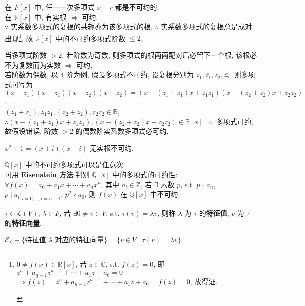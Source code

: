 \documentclass{note}
\begin{document}
在 $F[x]$ 中, 任一一次多项式 $x-r$ 都是不可约的.\\
在 $\mathbb{R}[x]$ 中, 有实根 $\Longleftrightarrow$ 可约.\\
$\because$ 实系数多项式的复根的共轭亦为该多项式的根, $\therefore$ 实系数多项式的复根总是成对出现\footnote{\begin{pf}
    $0\neq f(x)\in\mathbb{R}[x]$, 若 $z\in\mathbb{C}$, s.t. $f(z)=0$, 即 $z^n+a_{n-1}z^{n-1}+\cdots+a_1z+a_0=0$\\
    $\Longrightarrow\overline{f(z)}=\bar{z}^n+a_{n-1}\bar{z}^{n-1}+\cdots+a_1\bar{z}+a_0=f(\bar{z})=0$, 故得证.
\end{pf}}, 故 $\mathbb{R}[x]$ 中的不可约多项式阶数 $\leq 2$.
\begin{pf}
    当多项式阶数 $>2$, 若阶数为奇数, 则多项式的根两两配对后必留下一个根, 该根必不为复数而为实数 $\Longrightarrow$ 可约;\\
    若阶数为偶数, 以 $4$ 阶为例, 假设多项式不可约, 设复根分别为 $z_1,\bar{z_1},z_2,\bar{z_2}$, 则多项式可写为 $(x-z_1)(x-\bar{z}_1)(x-z_2)(x-\bar{z}_2)=(x-(z_1+\bar{z}_1)x+z_1\bar{z}_1)(x-(z_2+\bar{z}_2)x+z_2\bar{z}_2)$.\\
    $(z_1+\bar{z}_1),z_1\bar{z_1},(z_2+\bar{z}_2),z_2\bar{z_2}\in\mathbb{R}$, $\therefore (x-(z_1+\bar{z}_1)x+z_1\bar{z}_1),(x-(z_2+\bar{z}_2)x+z_2\bar{z}_2)\in\mathbb{R}[x]\Longrightarrow$ 多项式可约, 故假设错误, 阶数 $>2$ 的偶数阶实系数多项式必可约.
\end{pf}
\begin{eg}
    $x^2+1=(x+i)(x-i)$ 无实根不可约.
\end{eg}
$\mathbb{Q}[x]$ 中的不可约多项式可以是任意次.\\
可用 \textbf{Eisenstein 方法} 判别 $\mathbb{Q}[x]$ 中的多项式的可约性: $\forall f(x)=a_0+a_1x+\cdots+a_nx^n$, 其中 $a_i\in\mathbb{Z}$, 若 $\exists$ 素数 $p$, s.t. $p\nmid a_n$, $p\mid a_i\vert_{i=0,\cdots,i=n-1}$, $p^2\nmid a_0$, 则 $f(x)$ 在 $\mathbb{Q}[x]$ 中不可约.

\begin{df}[特征值和特征向量]
    $\tau\in\mathcal{L}(V)$, $\lambda\in F$, 若 $\exists 0\neq v\in V$, s.t. $\tau(v)=\lambda v$, 则称 $\lambda$ 为 $\tau$ 的\textbf{特征值}, $v$ 为 $\tau$ 的\textbf{特征向量}.
\end{df}

\begin{df}
    $\mathcal{E}_{\lambda}\equiv\{\text{特征值 $\lambda$ 对应的特征向量}\}=\{v\in V\mid\tau(v)=\lambda v\}$.
\end{df}
\end{document}
